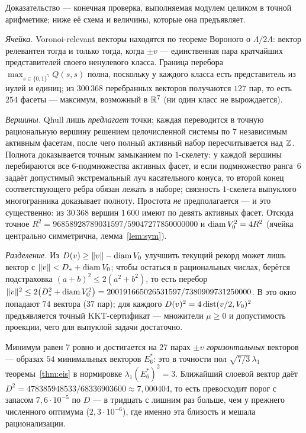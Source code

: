 Доказательство --- конечная проверка, выполняемая
модулем 
целиком в точной арифметике; ниже
её схема и величины, которые она предъявляет.

\emph{Ячейка.} Voronoi-relevant векторы находятся по теореме Вороного о
$\Lambda/2\Lambda$: вектор релевантен тогда и только тогда, когда $\pm v$ ---
единственная пара кратчайших представителей своего ненулевого класса. Граница
перебора $\max_{s\in\{0,1\}^7}Q(s,s)$ полна, поскольку у каждого класса есть
представитель из нулей и единиц; из $300\,368$ перебранных векторов получаются
$127$ пар, то есть $254$ фасеты --- максимум, возможный в $\mathbb{R}^7$ (ни один класс
не вырождается).

\emph{Вершины.} Qhull лишь \emph{предлагает} точки; каждая переводится в точную
рациональную вершину решением целочисленной системы по $7$ независимым активным
фасетам, после чего полный активный набор пересчитывается над $\mathbb{Z}$. Полнота
доказывается точным замыканием по $1$-скелету: у каждой вершины перебираются
все $6$-подмножества активных фасет, и если подмножество ранга~$6$ задаёт
допустимый экстремальный луч касательного конуса, то второй конец
соответствующего ребра обязан лежать в наборе; связность $1$-скелета выпуклого
многогранника доказывает полноту. Простота \emph{не} предполагается --- и это
существенно: из $30\,368$ вершин $1\,600$ имеют по девять активных фасет.
Отсюда точное $R^2=96858928789031597/59047277850000000$ и
$\operatorname{diam} V_0^2=4R^2$ (ячейка центрально симметрична, лемма~\ref{lem:sym}).

\emph{Разделение.} Из $D(v)\ge\|v\|-\operatorname{diam} V_0$ улучшить текущий рекорд может
лишь вектор с $\|v\|<D_{*}+\operatorname{diam} V_0$; чтобы остаться в рациональных числах,
берётся подстраховка $(a+b)^2\le2(a^2+b^2)$, то есть перебор
$\|v\|^2\le2\bigl(D_{*}^2+\operatorname{diam} V_0^2\bigr)=
200191665026531597/7380909731250000$. В это окно попадают $74$ вектора
($37$ пар); для каждого $D(v)^2=4\operatorname{dist}(v/2,V_0)^2$ предъявляется точный
KKT-сертификат --- множители $\mu\ge0$ и допустимость проекции, чего для
выпуклой задачи достаточно.

Минимум равен $7$ ровно и достигается на $27$ парах $\pm v$
\emph{горизонтальных} векторов --- образах $54$ минимальных векторов $E_6^*$:
это в точности пол $\sqrt{7/3}\,\lambda_1$ теоремы~\ref{thm:eis} в нормировке
$\lambda_1(E_6^*)^2=3$. Ближайший слоевой вектор даёт
$D^2=478385948533/68336903600\approx7{,}000404$, то есть превосходит порог с
запасом $7{,}6\cdot10^{-5}$ по $D$ --- в тридцать с лишним раз больше, чем у
прежнего численного оптимума ($2{,}3\cdot10^{-6}$), где именно эта близость и
мешала рационализации.

